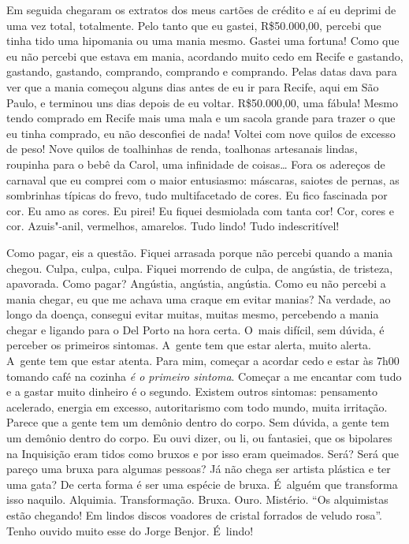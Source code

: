 Em seguida chegaram os extratos dos meus cartões de crédito e aí eu
deprimi de uma vez total, totalmente. Pelo tanto que eu gastei,
R\$50.000,00, percebi que tinha tido uma hipomania ou uma mania mesmo.
Gastei uma fortuna! Como que eu não percebi que estava em mania,
acordando muito cedo em Recife e gastando, gastando, gastando,
comprando, comprando e comprando. Pelas datas dava para ver que a mania
começou alguns dias antes de eu ir para Recife, aqui em São Paulo, e
terminou uns dias depois de eu voltar. R\$50.000,00, uma fábula! Mesmo
tendo comprado em Recife mais uma mala e um sacola grande para trazer o
que eu tinha comprado, eu não desconfiei de nada! Voltei com nove quilos
de excesso de peso! Nove quilos de toalhinhas de renda, toalhonas
artesanais lindas, roupinha para o bebê da Carol, uma infinidade de
coisas… Fora os adereços de carnaval que eu comprei com o maior
entusiasmo: máscaras, saiotes de pernas, as sombrinhas típicas do frevo,
tudo multifacetado de cores. Eu fico fascinada por cor. Eu amo as cores.
Eu pirei! Eu fiquei desmiolada com tanta cor! Cor, cores e cor.
Azuis"-anil, vermelhos, amarelos. Tudo lindo! Tudo indescritível!

Como pagar, eis a questão. Fiquei arrasada porque não percebi quando a
mania chegou. Culpa, culpa, culpa. Fiquei morrendo de culpa, de
angústia, de tristeza, apavorada. Como pagar? Angústia, angústia,
angústia. Como eu não percebi a mania chegar, eu que me achava uma
craque em evitar manias? Na verdade, ao longo da doença, consegui evitar
muitas, muitas mesmo, percebendo a mania chegar e ligando para o Del
Porto na hora certa. O~mais difícil, sem dúvida, é perceber os primeiros
sintomas. A~gente tem que estar alerta, muito alerta. A~gente tem que
estar atenta. Para mim, começar a acordar cedo e estar às 7h00 tomando
café na cozinha \emph{é o primeiro sintoma}. Começar a me encantar com
tudo e a gastar muito dinheiro é o segundo. Existem outros sintomas:
pensamento acelerado, energia em excesso, autoritarismo com todo mundo,
muita irritação. Parece que a gente tem um demônio dentro do corpo.
Sem dúvida, a gente tem um demônio dentro do corpo. Eu ouvi dizer, ou
li, ou fantasiei, que os bipolares na Inquisição eram tidos como bruxos
e por isso eram queimados. Será? Será que pareço uma bruxa para algumas
pessoas? Já não chega ser artista plástica e ter uma gata? De certa
forma é ser uma espécie de bruxa. É~alguém que transforma isso naquilo.
Alquimia. Transformação. Bruxa. Ouro. Mistério. ``Os alquimistas estão
chegando! Em lindos discos voadores de cristal forrados de veludo
rosa''. Tenho ouvido muito esse  do Jorge Benjor. É~lindo!

